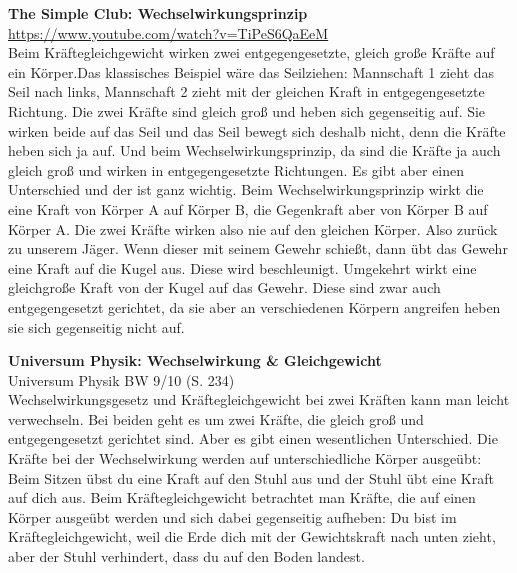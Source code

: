 \documentclass[
	aspectratio=169, %
	8pt, %
]{beamer}
\begin{document}
\begin{frame}
	\begin{mycolumns}
		\textbf{The Simple Club: Wechselwirkungsprinzip} \\ {\tiny \href{https://www.youtube.com/watch?v=TiPeS6QaEeM}{https://www.youtube.com/watch?v=TiPeS6QaEeM}} \\[1em]
{\footnotesize 
Beim Kräftegleichgewicht wirken zwei entgegengesetzte, gleich große Kräfte auf ein Körper.Das klassisches Beispiel wäre das Seilziehen: Mannschaft 1 zieht das Seil nach links, Mannschaft 2 zieht mit der gleichen Kraft in entgegengesetzte Richtung. Die zwei Kräfte sind gleich groß und heben sich gegenseitig auf. Sie wirken beide auf das Seil und das Seil bewegt sich deshalb nicht, denn die Kräfte heben sich ja auf. Und beim Wechselwirkungsprinzip, da sind die Kräfte ja auch gleich groß und wirken in entgegengesetzte Richtungen. Es gibt aber einen Unterschied und der ist ganz wichtig. Beim Wechselwirkungsprinzip wirkt die eine Kraft von Körper A auf Körper B, die Gegenkraft aber von Körper B auf Körper A. Die zwei Kräfte wirken also nie auf den gleichen Körper. Also zurück zu unserem Jäger. Wenn dieser mit seinem Gewehr schießt, dann übt das Gewehr eine Kraft auf die Kugel aus. Diese wird beschleunigt. Umgekehrt wirkt eine gleichgroße Kraft von der Kugel auf das Gewehr. Diese sind zwar auch entgegengesetzt gerichtet, da sie aber an verschiedenen Körpern angreifen heben sie sich gegenseitig nicht auf.
}



		\mynextcolumn
		\textbf{Universum Physik: Wechselwirkung \& Gleichgewicht} \\
{\tiny Universum Physik BW 9/10 (S. 234)}\\[1em]
{\footnotesize 
Wechselwirkungsgesetz und Kräftegleichgewicht bei zwei Kräften kann man leicht verwechseln. Bei beiden geht es um zwei Kräfte, die gleich groß und entgegengesetzt gerichtet sind. Aber es gibt einen wesentlichen Unterschied. Die Kräfte bei der Wechselwirkung werden auf unterschiedliche Körper ausgeübt: Beim Sitzen übst du eine Kraft auf den Stuhl aus und der Stuhl übt eine Kraft auf dich aus. Beim Kräftegleichgewicht betrachtet man Kräfte, die auf einen Körper ausgeübt werden und sich dabei gegenseitig aufheben: Du bist im Kräftegleichgewicht, weil die Erde dich mit der Gewichtskraft nach unten zieht, aber der Stuhl verhindert, dass du auf den Boden landest.}\\[7em] \



	\end{mycolumns}
\end{frame}
\end{document}
